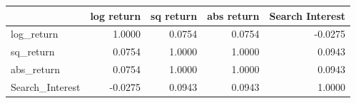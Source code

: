 \begin{table}[htbp]
\centering
\begin{tabular}{lrrrr}
\toprule
 & log return & sq return & abs return & Search Interest \\
\midrule
log_return & 1.0000 & 0.0754 & 0.0754 & -0.0275 \\
sq_return & 0.0754 & 1.0000 & 1.0000 & 0.0943 \\
abs_return & 0.0754 & 1.0000 & 1.0000 & 0.0943 \\
Search_Interest & -0.0275 & 0.0943 & 0.0943 & 1.0000 \\
\bottomrule
\end{tabular}
\label{tab:correlation_spearman}
\end{table}
